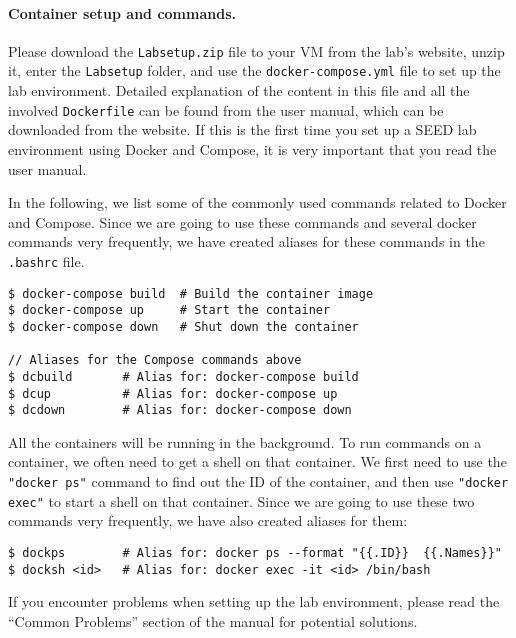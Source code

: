 \paragraph{Container setup and commands.}
Please download the
\texttt{Labsetup.zip} file to your VM from the lab's website,
unzip it, enter the \texttt{Labsetup} folder, and 
use the \texttt{docker-compose.yml} file to 
set up the lab environment. Detailed explanation
of the content in this file and all the involved 
\texttt{Dockerfile} can be found from the 
user manual, which can be downloaded from the website. 
If this is the first time you set up a SEED lab environment
using Docker and Compose, it is very important that you read 
the user manual. 

In the following, we list some of the commonly
used commands related to Docker and Compose. 
Since we are going to use 
these commands and several docker commands very
frequently, we have created aliases for these commands
in the \texttt{.bashrc} file.  


\begin{lstlisting}
$ docker-compose build  # Build the container image
$ docker-compose up     # Start the container
$ docker-compose down   # Shut down the container

// Aliases for the Compose commands above
$ dcbuild       # Alias for: docker-compose build
$ dcup          # Alias for: docker-compose up
$ dcdown        # Alias for: docker-compose down
\end{lstlisting}


All the containers will be running in the background. To run
commands on a container, we often need to get a shell on
that container. We first need to use the \texttt{"docker ps"}  
command to find out the ID of the container, and then
use \texttt{"docker exec"} to start a shell on that 
container. Since we are going to use these two commands
very frequently, we have also created aliases
for them:

\begin{lstlisting}
$ dockps        # Alias for: docker ps --format "{{.ID}}  {{.Names}}" 
$ docksh <id>   # Alias for: docker exec -it <id> /bin/bash
\end{lstlisting}


If you encounter problems when setting up the lab environment, 
please read the ``Common Problems'' section of the manual
for potential solutions.

